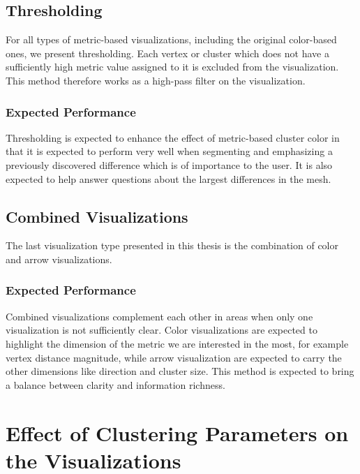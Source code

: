 \subsection{Thresholding}

For all types of metric-based visualizations, including the original color-based ones, we present thresholding. Each vertex or cluster which does not have a sufficiently high metric value assigned to it is excluded from the visualization. This method therefore works as a high-pass filter on the visualization.

\subsubsection{Expected Performance}

Thresholding is expected to enhance the effect of metric-based cluster color in that it is expected to perform very well when segmenting and emphasizing a previously discovered difference which is of importance to the user. It is also expected to help answer questions about the largest differences in the mesh.
\subsection{Combined Visualizations}

The last visualization type presented in this thesis is the combination of color and arrow visualizations.

\subsubsection{Expected Performance}

Combined visualizations complement each other in areas when only one visualization is not sufficiently clear. Color visualizations are expected to highlight the dimension of the metric we are interested in the most, for example vertex distance magnitude, while arrow visualization are expected to carry the other dimensions like direction and cluster size. This method is expected to bring a balance between clarity and information richness.
\section{Effect of Clustering Parameters on the Visualizations}


